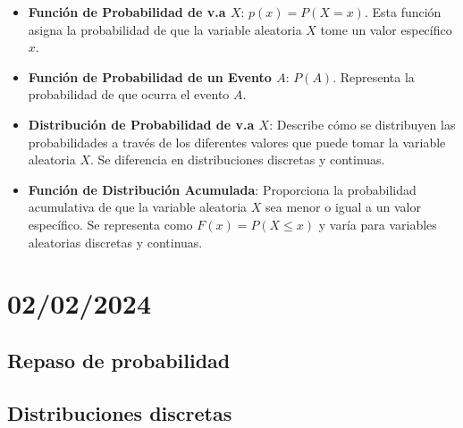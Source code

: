 \documentclass{article}
\begin{document}
\begin{itemize}
    \item \textbf{Función de Probabilidad de v.a \( X \)}: \( p(x) = P(X=x) \). Esta función asigna la probabilidad de que la variable aleatoria \( X \) tome un valor específico \( x \).

    \item \textbf{Función de Probabilidad de un Evento \( A \)}: \( P(A) \). Representa la probabilidad de que ocurra el evento \( A \).

    \item \textbf{Distribución de Probabilidad de v.a \( X \)}: Describe cómo se distribuyen las probabilidades a través de los diferentes valores que puede tomar la variable aleatoria \( X \). Se diferencia en distribuciones discretas y continuas.

    \item \textbf{Función de Distribución Acumulada}: Proporciona la probabilidad acumulativa de que la variable aleatoria \( X \) sea menor o igual a un valor específico. Se representa como \( F(x) = P(X \leq x) \) y varía para variables aleatorias discretas y continuas.
\end{itemize}

\section{02/02/2024}

\subsection{Repaso de probabilidad}

\subsection{Distribuciones discretas}
\end{document}

